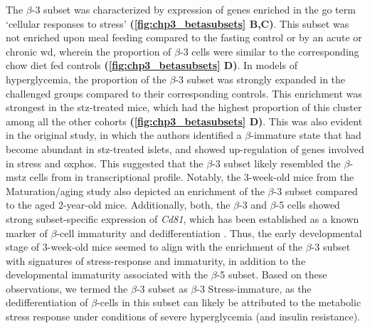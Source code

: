 \par The $\beta$-3 subset was characterized by expression of genes enriched in the \gls{go} term `cellular responses to stress' \textbf{(\autoref{fig:chp3_betasubsets} B,C)}. This subset was not enriched upon meal feeding compared to the fasting control or by an acute or chronic \gls{wd}, wherein the proportion of $\beta$-3 cells were similar to the corresponding chow diet fed controls \textbf{(\autoref{fig:chp3_betasubsets} D)}. In models of hyperglycemia, the proportion of the $\beta$-3 subset was strongly expanded in the challenged groups compared to their corresponding controls. This enrichment was strongest in the \gls{stz}-treated mice, which had the highest proportion of this cluster among all the other cohorts \textbf{(\ref{fig:chp3_betasubsets} D)}. This was also evident in the original study, in which the authors identified a $\beta$-immature state that had become abundant in \gls{stz}-treated islets, and showed up-regulation of genes involved in  stress and \gls{oxphos}. This suggested that the $\beta$-3 subset likely resembled the $\beta$-m\gls{stz} cells from \textbf{\cite{sachs_targeted_2020}} in transcriptional profile. Notably, the 3-week-old mice from the Maturation/aging study also depicted an enrichment of the $\beta$-3 subset compared to the aged 2-year-old mice. Additionally, both, the $\beta$-3 and $\beta$-5 cells showed strong subset-specific  expression of \textit{Cd81}, which has been established as a known marker of $\beta$-cell immaturity and dedifferentiation \textbf{\cite{salinno_cd81_2021}}. Thus, the early developmental stage of 3-week-old mice seemed to align with the enrichment of the $\beta$-3 subset with signatures of stress-response and immaturity, in addition to the developmental immaturity associated with the $\beta$-5 subset. 
Based on these observations, we termed the $\beta$-3 subset as $\beta$-3 Stress-immature, as the dedifferentiation of $\beta$-cells in this subset can likely be attributed to the metabolic stress response under conditions of severe hyperglycemia (and insulin resistance).\\

